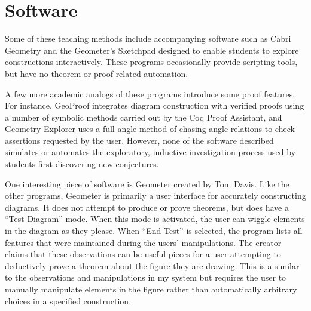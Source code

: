 \section{Software}
Some of these teaching methods include accompanying software such as
Cabri Geometry \cite{cabri} and the Geometer's Sketchpad
\cite{geoSketchpad} designed to enable students to explore
constructions interactively.  These programs occasionally provide
scripting tools, but have no theorem or proof-related automation.

A few more academic analogs of these programs introduce some proof
features.  For instance, GeoProof \cite{geoProof} integrates diagram
construction with verified proofs using a number of symbolic methods
carried out by the Coq Proof Assistant, and Geometry Explorer
\cite{geoExplorer} uses a full-angle method of chasing angle relations
to check assertions requested by the user.  However, none of the
software described simulates or automates the exploratory, inductive
investigation process used by students first discovering new
conjectures.

One interesting piece of software is Geometer \cite{geometer} created
by Tom Davis. Like the other programs, Geometer is primarily a user
interface for accurately constructing diagrams. It does not attempt to
produce or prove theorems, but does have a ``Test Diagram'' mode. When
this mode is activated, the user can wiggle elements in the diagram as
they please. When ``End Test'' is selected, the program lists all
features that were maintained during the users' manipulations. The
creator claims that these observations can be useful pieces for a user
attempting to deductively prove a theorem about the figure they are
drawing. This is a similar to the observations and manipulations in my
system but requires the user to manually manipulate elements in the
figure rather than automatically arbitrary choices in a specified
construction.
